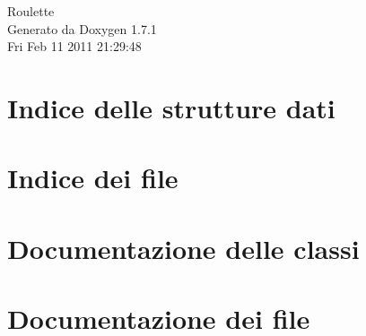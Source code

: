 \documentclass[a4paper]{book}
\begin{document}
\hypersetup{pageanchor=false}
\begin{titlepage}
\vspace*{7cm}
\begin{center}
{\Large Roulette }\\
\vspace*{1cm}
{\large Generato da Doxygen 1.7.1}\\
\vspace*{0.5cm}
{\small Fri Feb 11 2011 21:29:48}\\
\end{center}
\end{titlepage}
\clearemptydoublepage
{}
\tableofcontents
\clearemptydoublepage
{}
\hypersetup{pageanchor=true}
\chapter{Indice delle strutture dati}

\chapter{Indice dei file}

\chapter{Documentazione delle classi}










\chapter{Documentazione dei file}





\printindex
\end{document}
